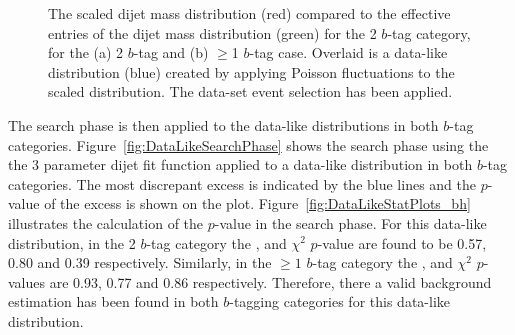 \begin{figure}[!ht]
  \begin{center}
   \captionsetup[subfigure]{aboveskip=0pt,justification=centering}
  \end{center}
  \caption{The scaled dijet mass distribution (red) compared to the
    effective entries of the dijet mass distribution (green) for the 2 $b$-tag category,
    for the (a) 2 $b$-tag and (b) $\geq$1 $b$-tag case.
    Overlaid is a data-like distribution (blue) created by applying Poisson fluctuations to the scaled distribution.
    The \summer{} data-set event selection has been applied.}
  \label{fig:effEntDataLike}
\end{figure}

The search phase is then applied to the data-like distributions
in both $b$-tag categories.
Figure~\ref{fig:DataLikeSearchPhase} shows the search phase 
using the the 3 parameter dijet fit function
applied to a  data-like distribution in both $b$-tag categories.
The most discrepant excess is indicated by the blue lines and the \bh{} \mbox{$p$-value} of the excess is shown on the plot.
Figure~\ref{fig:DataLikeStatPlots_bh} illustrates the calculation of the \bh{} $p$-value in the search phase.
For this data-like distribution, in the 2 $b$-tag category
the \bh{}, \dhunt{} and  $\chi^{2}$ \mbox{$p$-value} are found to be
0.57, 0.80 and 0.39 respectively.
Similarly, in the $\geq1$ $b$-tag category the
\bh{}, \dhunt{} and  $\chi^{2}$ \mbox{$p$-value}s are
0.93, 0.77 and 0.86 respectively.
Therefore, there a valid background estimation has been found in both $b$-tagging categories for this data-like distribution.

